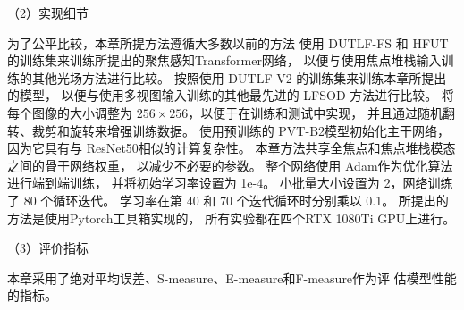 （2）实现细节



为了公平比较，本章所提方法遵循大多数以前的方法
使用 DUTLF-FS 和 HFUT 的训练集来训练所提出的聚焦感知Transformer网络，
以便与使用焦点堆栈输入训练的其他光场方法进行比较。 
按照使用 DUTLF-V2 的训练集来训练本章所提出的模型，
以便与使用多视图输入训练的其他最先进的 LFSOD 方法进行比较。 
将每个图像的大小调整为 $256 \times 256$，以便于在训练和测试中实现，
并且通过随机翻转、裁剪和旋转来增强训练数据。
使用预训练的 PVT-B2模型初始化主干网络，
因为它具有与 ResNet50相似的计算复杂性。 
本章方法共享全焦点和焦点堆栈模态之间的骨干网络权重，
以减少不必要的参数。 
整个网络使用 Adam作为优化算法进行端到端训练，
并将初始学习率设置为 1e-4。 
小批量大小设置为 2，网络训练了 80 个循环迭代。 学习率在第 40 和 70 个迭代循环时分别乘以 0.1。 
所提出的方法是使用Pytorch工具箱实现的，
所有实验都在四个RTX 1080Ti GPU上进行。 



（3）评价指标



本章采用了绝对平均误差、S-measure、E-measure和F-measure作为评
估模型性能的指标。








